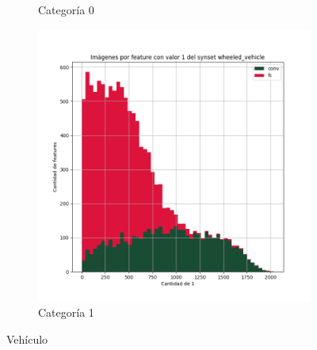 \documentclass[12,twoside]{TFG-GM}
\theoremstyle{definition}
\theoremstyle{remark}
\begin{document}
\begin{figure}[ht]
\begin{subfigure}[b]{0.3\textwidth}
		\caption{Categoría 0}
	\end{subfigure}
	\begin{subfigure}[b]{0.3\textwidth}
		\includegraphics[width=\textwidth]  {Images/plots/25/synsets/Images_per_feature_of_1_category_wheeled_vehicleall_layers.png}
		\caption{Categoría 1}
	\end{subfigure}       
	\caption{Vehículo}
\end{figure}

\end{document}
